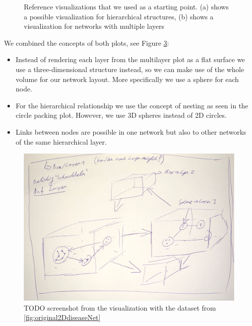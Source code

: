 \begin{figure}[h]
\begin{subfigure}[b]{0.50\columnwidth}
      \label{fig:2dmultilayerVis}
    \end{subfigure}
    \caption[Optional caption for the figure list (often used to abbreviate long captions)]{Reference visualizations that we used as a starting point. (a) shows a possible visualization for hierarchical structures, (b) shows a visualization for networks with multiple layers} %
    \label{fig:referenceVisualizations} 
  \end{figure}

We combined the concepts of both plots, see Figure \ref{fig:conceptSketch}: 
\begin{itemize}
    \item Instead of rendering each layer from the multilayer plot as a flat surface we use a three-dimensional structure instead, so we can make use of the whole volume for our network layout. More specifically we use a sphere for each node.
    \item For the hierarchical relationship we use the concept of nesting as seen in the circle packing plot. However, we use 3D spheres instead of 2D circles. 
    \item Links between nodes are possible in one network but also to other networks of the same hierarchical layer.   
\end{itemize}

\begin{figure}[h]
    \centering
    \includegraphics[width=1\textwidth]{chapters/graphics/concept1.jpg}
    \caption{TODO screenshot from the visualization with the dataset from \ref{fig:original2DdiseaseNet}} %
    \label{fig:conceptSketch} 
\end{figure}


